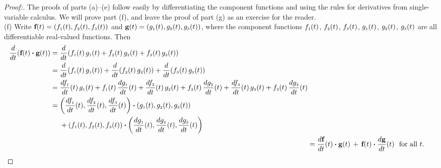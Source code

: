 \begin{proofbar}\begin{proof}[Proof:]
 The proofs of parts (a)--(e) follow easily by differentiating the component functions and using the rules for derivatives from single-variable calculus. 
 We will prove part (f), and leave the proof of part (g) as an exercise for
 the reader.
 \smallskip\\(f)
 Write $\textbf{f}(t) = ( f_{\scriptscriptstyle 1}(t),f_{\scriptscriptstyle 2}(t),f_{\scriptscriptstyle 3}(t) )$ and
 $\textbf{g}(t) = ( g_{\scriptscriptstyle 1}(t),g_{\scriptscriptstyle 2}(t),g_{\scriptscriptstyle 3}(t) )$, where the component functions
 $f_{\scriptscriptstyle 1}(t)$, $f_{\scriptscriptstyle 2}(t)$, $f_{\scriptscriptstyle 3}(t)$, $g_{\scriptscriptstyle 1}(t)$, $g_{\scriptscriptstyle 2}(t)$, $g_{\scriptscriptstyle 3}(t)$ are all
 differentiable real-valued functions. Then
 \begin{align*}\begin{split}
  \dfrac{d}{dt} ( \textbf{f}(t) \bm{\cdot} \textbf{g}(t) ) &= \dfrac{d}{dt} ( f_{\scriptscriptstyle 1}(t)\,g_{\scriptscriptstyle 1}(t) +
   f_{\scriptscriptstyle 2}(t)\,g_{\scriptscriptstyle 2}(t) + f_{\scriptscriptstyle 3}(t)\,g_{\scriptscriptstyle 3}(t) )\\
  &= \dfrac{d}{dt} ( f_{\scriptscriptstyle 1}(t)\,g_{\scriptscriptstyle 1}(t) ) +
   \dfrac{d}{dt} ( f_{\scriptscriptstyle 2}(t)\,g_{\scriptscriptstyle 2}(t) ) + \dfrac{d}{dt} ( f_{\scriptscriptstyle 3}(t)\,g_{\scriptscriptstyle 3}(t) )\\
  &= \dfrac{df_{\scriptscriptstyle 1}}{dt}(t)\,g_{\scriptscriptstyle 1}(t) + f_{\scriptscriptstyle 1}(t)\,\dfrac{dg_{\scriptscriptstyle 1}}{dt}(t) +
   \dfrac{df_{\scriptscriptstyle 2}}{dt}(t)\,g_{\scriptscriptstyle 2}(t) + f_{\scriptscriptstyle 2}(t)\,\dfrac{dg_{\scriptscriptstyle 2}}{dt}(t) +
   \dfrac{df_{\scriptscriptstyle 3}}{dt}(t)\,g_{\scriptscriptstyle 3}(t) + f_{\scriptscriptstyle 3}(t)\,\dfrac{dg_{\scriptscriptstyle 3}}{dt}(t)\\
  &= \biggl( \dfrac{df_{\scriptscriptstyle 1}}{dt}(t),\dfrac{df_{\scriptscriptstyle 2}}{dt}(t),\dfrac{df_{\scriptscriptstyle 3}}{dt}(t) \biggr) \bm{\cdot} 
   ( g_{\scriptscriptstyle 1}(t),g_{\scriptscriptstyle 2}(t),g_{\scriptscriptstyle 3}(t) )\\
   &\mathrel{\phantom{=}} {} + ( f_{\scriptscriptstyle 1}(t),f_{\scriptscriptstyle 2}(t),f_{\scriptscriptstyle 3}(t) ) \bm{\cdot} 
   \biggl( \dfrac{dg_{\scriptscriptstyle 1}}{dt}(t),\dfrac{dg_{\scriptscriptstyle 2}}{dt}(t),\dfrac{dg_{\scriptscriptstyle 3}}{dt}(t) \biggr)\end{split}\\
  &= \dfrac{d\textbf{f}}{dt}(t) \bm{\cdot} \textbf{g}(t) \,+\, \textbf{f}(t) \bm{\cdot} \dfrac{d\textbf{g}}{dt}(t)
   \text{~~for all $t$.} \qedhere
 \end{align*}
\end{proof}\end{proofbar}

